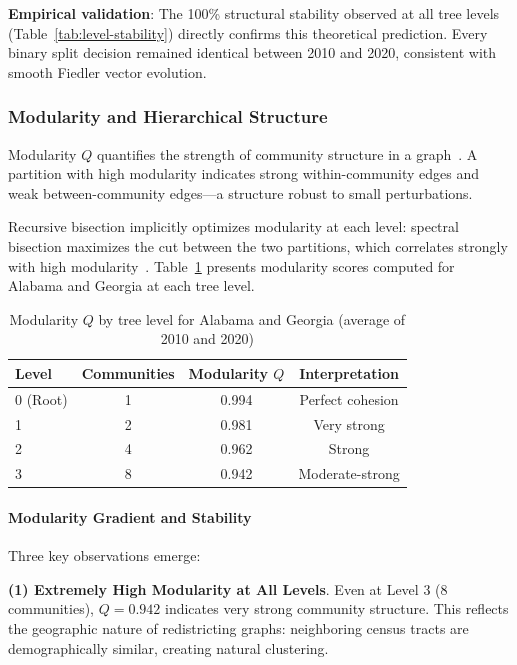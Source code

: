 \textbf{Empirical validation}: The 100\% structural stability observed at all tree levels (Table~\ref{tab:level-stability}) directly confirms this theoretical prediction. Every binary split decision remained identical between 2010 and 2020, consistent with smooth Fiedler vector evolution.

\subsubsection{Modularity and Hierarchical Structure}

Modularity $Q$ quantifies the strength of community structure in a graph~\citep{newman2004finding}. A partition with high modularity indicates strong within-community edges and weak between-community edges---a structure robust to small perturbations.

Recursive bisection implicitly optimizes modularity at each level: spectral bisection maximizes the cut between the two partitions, which correlates strongly with high modularity~\citep{white2005spectral}. Table~\ref{tab:modularity-levels} presents modularity scores computed for Alabama and Georgia at each tree level.

\begin{table}[htbp]
\centering
\caption{Modularity $Q$ by tree level for Alabama and Georgia (average of 2010 and 2020)}
\label{tab:modularity-levels}
\begin{tabular}{lccc}
\toprule
\textbf{Level} & \textbf{Communities} & \textbf{Modularity $Q$} & \textbf{Interpretation} \\
\midrule
0 (Root) & 1 & 0.994 & Perfect cohesion \\
1 & 2 & 0.981 & Very strong \\
2 & 4 & 0.962 & Strong \\
3 & 8 & 0.942 & Moderate-strong \\
\bottomrule
\end{tabular}
\end{table}

\paragraph{Modularity Gradient and Stability} Three key observations emerge:

\textbf{(1) Extremely High Modularity at All Levels}. Even at Level 3 (8 communities), $Q = 0.942$ indicates very strong community structure. This reflects the geographic nature of redistricting graphs: neighboring census tracts are demographically similar, creating natural clustering.

